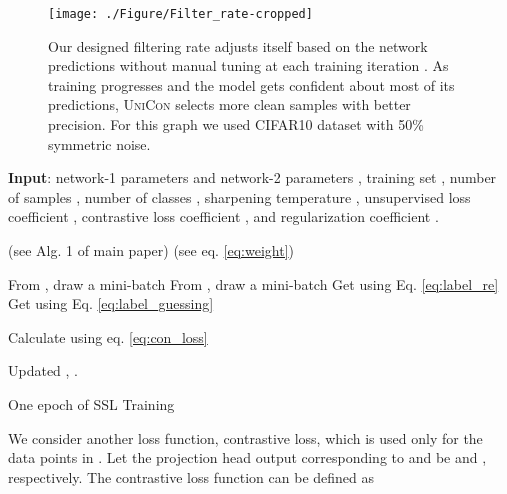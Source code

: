 \documentclass[10pt,twocolumn,letterpaper]{article}
\begin{document}
\begin{figure}
    \centering
    \texttt{[image: ./Figure/Filter\_rate-cropped]}
    \caption{Our designed filtering rate  adjusts itself based on the network predictions without manual tuning at each training iteration  \cite{yao2021jo}. As training progresses and the model gets confident about most of its predictions, \textsc{UniCon} selects more clean samples with better precision. For this graph we used CIFAR10 dataset with 50\% symmetric noise.}
    \label{fig:filter_rate}
\end{figure}
\begin{algorithm*}[htb]
	\DontPrintSemicolon
	\small
	\textbf{Input}: network-1 parameters   and network-2 parameters , training set , number of samples , number of classes ,
	sharpening temperature , unsupervised loss coefficient , contrastive loss coefficient , and regularization coefficient  .  
	
	\For { \KwTo }
	{
         (see Alg. 1 of main paper)  
         (see eq. \ref{eq:weight})  
		\For { \KwTo }
		{
			From , draw a mini-batch  
			From , draw a mini-batch  
			\For{ \KwTo }
			{   \For{ \KwTo }     
                {
                        
                }
				Get  using Eq. \ref{eq:label_re} 
				Get  using Eq. \ref{eq:label_guessing}
			}
	        
	        Calculate  using eq. \ref{eq:con_loss}  
		}
	}
	 Updated , .
	\caption{\small One epoch of SSL Training}
	\label{alg:SSL_training}
	
\end{algorithm*}


We consider another loss function, contrastive loss, which is used only for the data points in . 
Let the projection head output corresponding to   and  be  and , respectively. The contrastive loss function \cite{chen2020simple,khosla2020supervised} can be defined as
\end{document}
